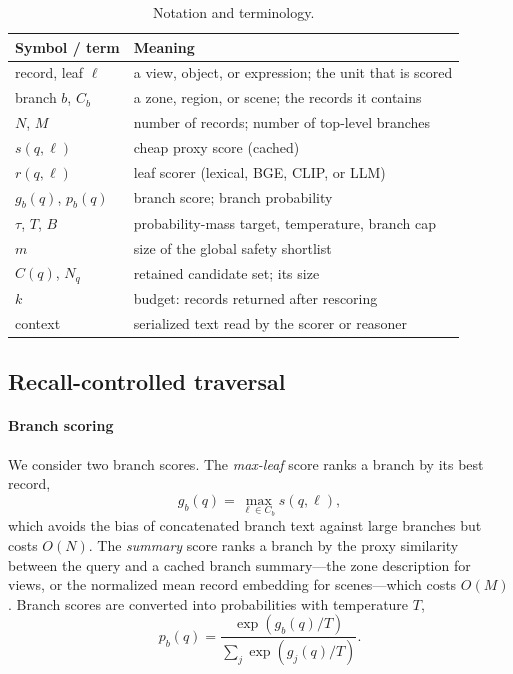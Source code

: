 \documentclass{ieeeaccess}
\begin{document}
\begin{table}[!t]
\centering
\caption{Notation and terminology.}
\label{tab:notation}
\footnotesize
\begin{tabular}{p{}p{}}
\toprule
Symbol / term & Meaning \\
\midrule
record, leaf $\ell$ & a view, object, or expression; the unit that is scored \\
branch $b$, $C_b$ & a zone, region, or scene; the records it contains \\
$N$, $M$ & number of records; number of top-level branches \\
$s(q,\ell)$ & cheap proxy score (cached) \\
$r(q,\ell)$ & leaf scorer (lexical, BGE, CLIP, or LLM) \\
$g_b(q)$, $p_b(q)$ & branch score; branch probability \\
$\tau$, $T$, $B$ & probability-mass target, temperature, branch cap \\
$m$ & size of the global safety shortlist \\
$C(q)$, $N_q$ & retained candidate set; its size \\
$k$ & budget: records returned after rescoring \\
context & serialized text read by the scorer or reasoner \\
\bottomrule
\end{tabular}
\end{table}

\subsection{Recall-controlled traversal}
\label{sec:traversal}
\paragraph{Branch scoring}
We consider two branch scores. The \emph{max-leaf} score ranks a branch by its
best record,
\begin{equation}
 g_b(q)=\max_{\ell\in C_b}s(q,\ell),
 \label{eq:maxleaf}
\end{equation}
which avoids the bias of concatenated branch text against large branches but
costs $O(N)$. The \emph{summary} score ranks a branch by the proxy similarity
between the query and a cached branch summary---the zone description for views,
or the normalized mean record embedding for scenes---which costs $O(M)$. Branch
scores are converted into probabilities with temperature $T$,
\begin{equation}
 p_b(q)=\frac{\exp(g_b(q)/T)}{\sum_{j}\exp(g_j(q)/T)}.
 \label{eq:softmax}
\end{equation}
\end{document}
